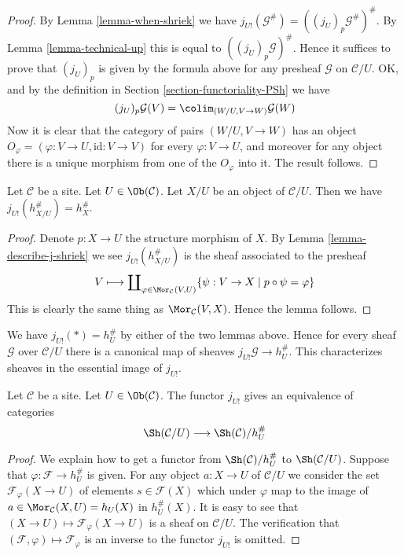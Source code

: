 \begin{proof}
By Lemma \ref{lemma-when-shriek} we have
$j_{U!}(\mathcal{G}^\#) = ((j_U)_p\mathcal{G}^\#)^\#$.
By Lemma \ref{lemma-technical-up} this is equal to $((j_U)_p\mathcal{G})^\#$.
Hence it suffices to prove that $(j_U)_p$ is given by
the formula above for any presheaf $\mathcal{G}$ on $\mathcal{C}/U$.
OK, and by the definition in Section \ref{section-functoriality-PSh} we have
$$
(j_U)_p\mathcal{G}(V)
=
\colim_{(W/U, V \to W)} \mathcal{G}(W)
$$
Now it is clear that the category of pairs $(W/U, V \to W)$
has an object $O_\varphi = (\varphi : V \to U, \text{id} : V \to V)$ for every
$\varphi : V \to U$, and moreover for any object there is a unique
morphism from one of the $O_\varphi$ into it. The result follows.
\end{proof}

\begin{lemma}
\label{lemma-describe-j-shriek-representable}
Let $\mathcal{C}$ be a site.
Let $U \in \Ob(\mathcal{C})$.
Let $X/U$ be an object of $\mathcal{C}/U$.
Then we have $j_{U!}(h_{X/U}^\#) = h_X^\#$.
\end{lemma}

\begin{proof}
Denote $p : X \to U$ the structure morphism of $X$.
By Lemma \ref{lemma-describe-j-shriek} we see $j_{U!}(h_{X/U}^\#)$
is the sheaf associated to the presheaf
$$
V
\longmapsto
\coprod\nolimits_{\varphi \in \Mor_\mathcal{C}(V, U)}
\{\psi : V \to X \mid p \circ \psi = \varphi\}
$$
This is clearly the same thing as $\Mor_\mathcal{C}(V, X)$.
Hence the lemma follows.
\end{proof}

\noindent
We have $j_{U!}(*) = h_U^\#$ by either of the
two lemmas above. Hence for every sheaf
$\mathcal{G}$ over $\mathcal{C}/U$ there is a canonical map
of sheaves $j_{U!}\mathcal{G} \to h_U^\#$. This characterizes
sheaves in the essential image of $j_{U!}$.

\begin{lemma}
\label{lemma-essential-image-j-shriek}
Let $\mathcal{C}$ be a site.
Let $U \in \Ob(\mathcal{C})$.
The functor $j_{U!}$ gives an equivalence of categories
$$
\Sh(\mathcal{C}/U)
\longrightarrow
\Sh(\mathcal{C})/h_U^\#
$$
\end{lemma}

\begin{proof}
We explain how to get a functor from
$\Sh(\mathcal{C})/h_U^\#$ to $\Sh(\mathcal{C}/U)$.
Suppose that $\varphi : \mathcal{F} \to h_U^\#$ is given.
For any object $a : X \to U$ of $\mathcal{C}/U$ we consider the set
$\mathcal{F}_\varphi(X \to U)$
of elements $s \in \mathcal{F}(X)$ which under $\varphi$ map to the image
of $a \in \Mor_\mathcal{C}(X, U) = h_U(X)$ in
$h_U^\#(X)$. It is easy to see that
$(X \to U) \mapsto \mathcal{F}_\varphi(X \to U)$ is
a sheaf on $\mathcal{C}/U$. The verification that
$(\mathcal{F}, \varphi) \mapsto \mathcal{F}_\varphi$
is an inverse to the functor $j_{U!}$ is omitted.
\end{proof}

